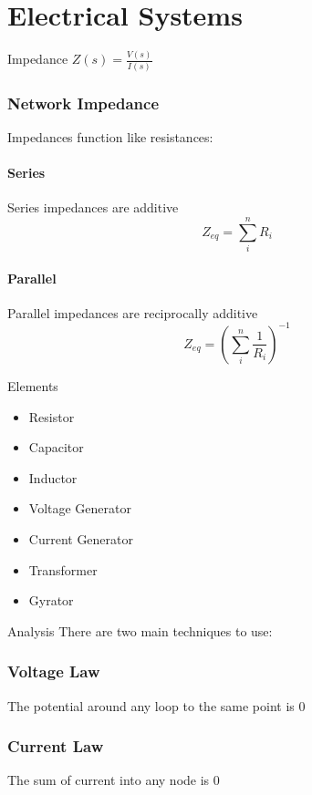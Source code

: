 \documentclass{../templates/topic}
\begin{document}
\chapter{Electrical Systems}

\begin{section}{Impedance}
	 $Z(s)=\frac{V(s)}{I(s)}$
	
	\subsection{Network Impedance}
	Impedances function like resistances:
	\subsubsection*{Series}
	Series impedances are additive
	\begin{equation}
		Z_{eq} = \sum_{i}^{n}{R_i}
	\end{equation}
	\subsubsection*{Parallel}
	Parallel impedances are reciprocally additive
	\begin{equation}
		Z_{eq} = (\sum_{i}^{n}{\frac{1}{R_i}})^{-1}
	\end{equation}
\end{section}

\begin{section}{Elements}
	\begin{itemize}
		\item Resistor
		\item Capacitor
		\item Inductor
		\item Voltage Generator
		\item Current Generator
		\item Transformer
		\item Gyrator
	\end{itemize}
\end{section}


\begin{section}{Analysis}
	There are two main techniques to use:
	\subsection{Voltage Law}
		The potential around any loop to the same point is 0
	\subsection{Current Law}
		The sum of current into any node is 0
\end{section}
\end{document}
